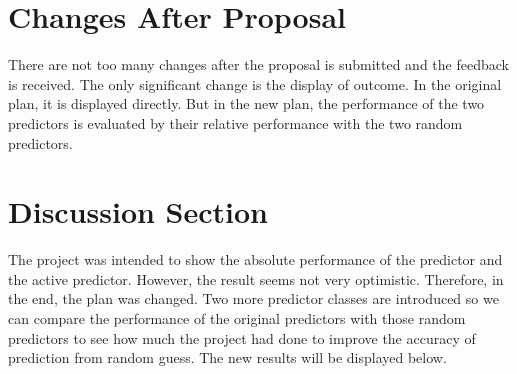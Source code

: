 \documentclass[fontsize=11pt]{article}
\begin{document}
\section*{Changes After Proposal}
There are not too many changes after the proposal is submitted and the feedback is received. The only significant change is the display of outcome. In the original plan, it is displayed directly. But in the new plan, the performance of the two predictors is evaluated by their relative performance with the two random predictors.

\section*{Discussion Section}
The project was intended to show the absolute performance of the predictor and the active predictor. However, the result seems not very optimistic. Therefore, in the end, the plan was changed. Two more predictor classes are introduced so we can compare the performance of the original predictors with those random predictors to see how much the project had done to improve the accuracy of prediction from random guess. The new results will be displayed below. 
\end{document}
